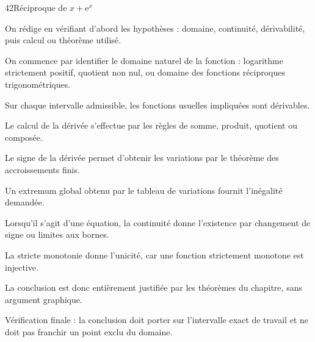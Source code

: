 \documentclass[11pt,a4paper]{article}
\newcommand{\e}{\mathrm{e}}
\begin{document}
\begin{corrbox}{42}{Réciproque de $x+\e^x$}

\begin{methodebox}
On rédige en vérifiant d'abord les hypothèses : domaine, continuité, dérivabilité, puis calcul ou théorème utilisé.
\end{methodebox}

On commence par identifier le domaine naturel de la fonction : logarithme strictement positif, quotient non nul, ou domaine des fonctions réciproques trigonométriques.


Sur chaque intervalle admissible, les fonctions usuelles impliquées sont dérivables.


Le calcul de la dérivée s'effectue par les règles de somme, produit, quotient ou composée.


Le signe de la dérivée permet d'obtenir les variations par le théorème des accroissements finis.


Un extremum global obtenu par le tableau de variations fournit l'inégalité demandée.


Lorsqu'il s'agit d'une équation, la continuité donne l'existence par changement de signe ou limites aux bornes.


La stricte monotonie donne l'unicité, car une fonction strictement monotone est injective.


La conclusion est donc entièrement justifiée par les théorèmes du chapitre, sans argument graphique.


\begin{attentionbox}
Vérification finale : la conclusion doit porter sur l'intervalle exact de travail et ne doit pas franchir un point exclu du domaine.
\end{attentionbox}

\end{corrbox}
\end{document}
